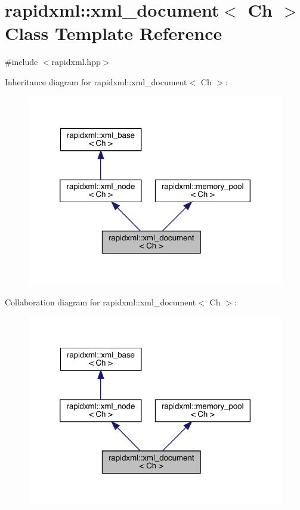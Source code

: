\hypertarget{classrapidxml_1_1xml__document}{}\section{rapidxml\+::xml\+\_\+document$<$ Ch $>$ Class Template Reference}
\label{classrapidxml_1_1xml__document}


{\ttfamily \#include $<$rapidxml.\+hpp$>$}



Inheritance diagram for rapidxml\+::xml\+\_\+document$<$ Ch $>$\+:\nopagebreak
\begin{figure}[H]
\begin{center}
\leavevmode
\includegraphics[width=320pt]{classrapidxml_1_1xml__document__inherit__graph}
\end{center}
\end{figure}


Collaboration diagram for rapidxml\+::xml\+\_\+document$<$ Ch $>$\+:\nopagebreak
\begin{figure}[H]
\begin{center}
\leavevmode
\includegraphics[width=320pt]{classrapidxml_1_1xml__document__coll__graph}
\end{center}
\end{figure}
